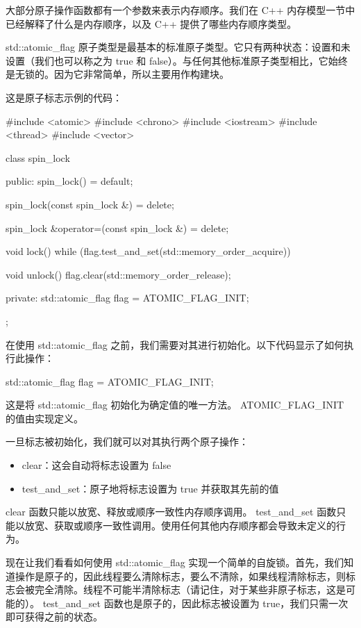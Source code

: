 大部分原子操作函数都有一个参数来表示内存顺序。我们在 C++ 内存模型一节中已经解释了什么是内存顺序，以及 C++ 提供了哪些内存顺序类型。


std::atomic\_flag 原子类型是最基本的标准原子类型。它只有两种状态：设置和未设置（我们也可以称之为 true 和 false）。与任何其他标准原子类型相比，它始终是无锁的。因为它非常简单，所以主要用作构建块。

这是原子标志示例的代码：

\begin{cpp}
#include <atomic>
#include <chrono>
#include <iostream>
#include <thread>
#include <vector>

class spin_lock {
    public:
    spin_lock() = default;

    spin_lock(const spin_lock &) = delete;

    spin_lock &operator=(const spin_lock &) = delete;

    void lock() {
        while (flag.test_and_set(std::memory_order_acquire)) {
        }
    }

    void unlock() {
        flag.clear(std::memory_order_release);
    }

private:
    std::atomic_flag flag = ATOMIC_FLAG_INIT;
};
\end{cpp}

在使用 std::atomic\_flag 之前，我们需要对其进行初始化。以下代码显示了如何执行此操作：

\begin{cpp}
std::atomic_flag flag = ATOMIC_FLAG_INIT;
\end{cpp}

这是将 std::atomic\_flag 初始化为确定值的唯一方法。 ATOMIC\_FLAG\_INIT 的值由实现定义。

一旦标志被初始化，我们就可以对其执行两个原子操作：

\begin{itemize}
\item
clear：这会自动将标志设置为 false

\item
test\_and\_set：原子地将标志设置为 true 并获取其先前的值
\end{itemize}

clear 函数只能以放宽、释放或顺序一致性内存顺序调用。 test\_and\_set 函数只能以放宽、获取或顺序一致性调用。使用任何其他内存顺序都会导致未定义的行为。

现在让我们看看如何使用 std::atomic\_flag 实现一个简单的自旋锁。首先，我们知道操作是原子的，因此线程要么清除标志，要么不清除，如果线程清除标志，则标志会被完全清除。线程不可能半清除标志（请记住，对于某些非原子标志，这是可能的）。 test\_and\_set 函数也是原子的，因此标志被设置为 true，我们只需一次即可获得之前的状态。

